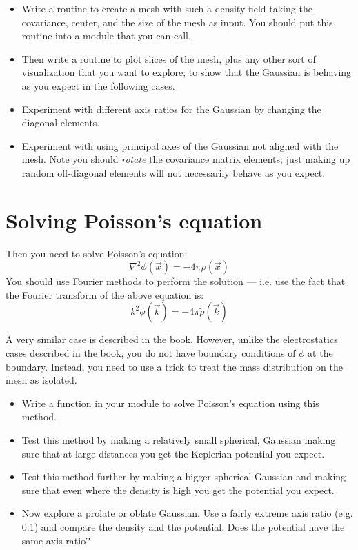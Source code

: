 \documentclass[11pt, preprint]{aastex}
\begin{document}
\begin{itemize}
\item Write a routine to create a mesh with such a density field
  taking the covariance, center, and the size of the mesh as
  input. You should put this routine into a module that you can call.
\item Then write a routine to plot slices of the mesh, plus any other
  sort of visualization that you want to explore, to show that the
  Gaussian is behaving as you expect in the following cases.
\item Experiment with different axis ratios for the Gaussian by
  changing the diagonal elements.
\item Experiment with using principal axes of the Gaussian not aligned
  with the mesh. Note you should {\it rotate} the covariance matrix
  elements; just making up random off-diagonal elements will not
  necessarily behave as you expect.
\end{itemize}

\section{Solving Poisson's equation}

Then you need to solve Poisson's equation:
\begin{equation}
\nabla^2 \phi(\vec{x}) = - 4\pi \rho(\vec{x})
\end{equation}
You should use Fourier methods to perform the solution --- i.e. use
the fact that the Fourier transform of the above equation is:
\begin{equation}
k^2 \tilde\phi(\vec{k}) = - 4\pi \tilde\rho(\vec{k})
\end{equation}

A very similar case is described in the book.  However, unlike the
electrostatics cases described in the book, you do not have boundary
conditions of $\phi$ at the boundary. Instead, you need to use a
trick to treat the mass distribution on the mesh as
isolated. 

\begin{itemize}
\item Write a function in your module to solve Poisson's equation
  using this method. 
\item Test this method by making a relatively small spherical,
  Gaussian making sure that at large distances you get the Keplerian
  potential you expect.
\item Test this method further by making a bigger spherical Gaussian
  and making sure that even where the density is high you get the
  potential you expect. 
\item Now explore a prolate or oblate Gaussian. Use a fairly extreme
  axis ratio (e.g. 0.1) and compare the density and the potential.
  Does the potential  have the same axis ratio?
\end{itemize}
\end{document}
